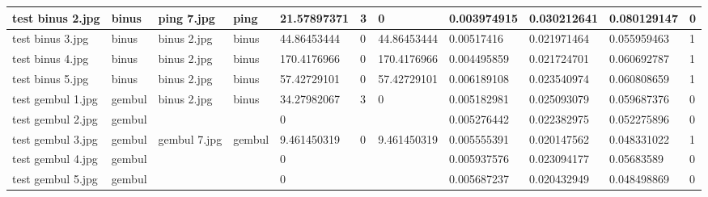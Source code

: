 \begin{landscape}
\begin{longtable}{|p{2cm}|p{1.5cm}|p{2cm}|p{1.5cm}|p{2cm}|p{1cm}|p{2cm}|p{2cm}|p{2cm}|p{2cm}|p{1cm}|}
		test binus 2.jpg     & binus            & ping 7.jpg            & ping                        & 21.57897371           & 3                       & 0                          & 0.003974915           & 0.030212641           & 0.080129147              & 0                \\ \hline
		test binus 3.jpg     & binus            & binus 2.jpg           & binus                       & 44.86453444           & 0                       & 44.86453444                & 0.00517416            & 0.021971464           & 0.055959463              & 1                \\ \hline
		test binus 4.jpg     & binus            & binus 2.jpg           & binus                       & 170.4176966           & 0                       & 170.4176966                & 0.004495859           & 0.021724701           & 0.060692787              & 1                \\ \hline
		test binus 5.jpg     & binus            & binus 2.jpg           & binus                       & 57.42729101           & 0                       & 57.42729101                & 0.006189108           & 0.023540974           & 0.060808659              & 1                \\ \hline
		test gembul 1.jpg    & gembul           & binus 2.jpg           & binus                       & 34.27982067           & 3                       & 0                          & 0.005182981           & 0.025093079           & 0.059687376              & 0                \\ \hline
		test gembul 2.jpg    & gembul           &                       &                             & 0                     &                         &                            & 0.005276442           & 0.022382975           & 0.052275896              & 0                \\ \hline
		test gembul 3.jpg    & gembul           & gembul 7.jpg          & gembul                      & 9.461450319           & 0                       & 9.461450319                & 0.005555391           & 0.020147562           & 0.048331022              & 1                \\ \hline
		test gembul 4.jpg    & gembul           &                       &                             & 0                     &                         &                            & 0.005937576           & 0.023094177           & 0.05683589               & 0                \\ \hline
		test gembul 5.jpg    & gembul           &                       &                             & 0                     &                         &                            & 0.005687237           & 0.020432949           & 0.048498869              & 0                \\ \hline

\end{longtable}
\end{landscape}

